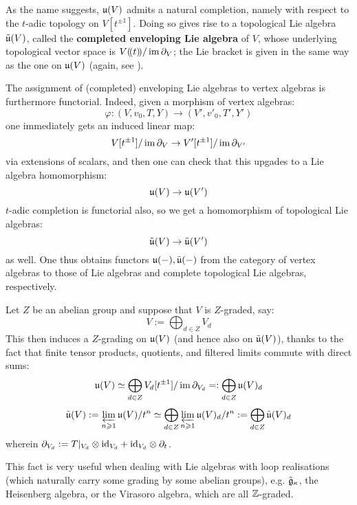         As the name suggests, $\mathfrak{u}(V)$ admits a natural completion, namely with respect to the $t$-adic topology on $V[t^{\pm 1}]$. Doing so gives rise to a topological Lie algebra $\tilde{\mathfrak{u}}(V)$, called the \textbf{completed enveloping Lie algebra} of $V$, whose underlying topological vector space is $V(\!(t)\!)/\operatorname{im} \partial_V$; the Lie bracket is given in the same way as the one on $\mathfrak{u}(V)$ (again, see \cite[Theorem 4.1.2]{frenkel_ben_zvi_vertex_algebras_and_algebraic_curves}).

        \begin{remark}
            The assignment of (completed) enveloping Lie algebras to vertex algebras is furthermore functorial. Indeed, given a morphism of vertex algebras:
                $$\varphi: (V, v_0, T, Y) \to (V', v'_0, T', Y')$$
            one immediately gets an induced linear map:
                $$V[t^{\pm 1}]/\operatorname{im} \partial_V \to V'[t^{\pm 1}]/\operatorname{im} \partial_{V'}$$
            via extensions of scalars, and then one can check that this upgades to a Lie algebra homomorphism:
                $$\mathfrak{u}(V) \to \mathfrak{u}(V')$$
            $t$-adic completion is functorial also, so we get a homomorphism of topological Lie algebras:
                $$\tilde{\mathfrak{u}}(V) \to \tilde{\mathfrak{u}}(V')$$
            as well. One thus obtains functors $\mathfrak{u}(-), \tilde{\mathfrak{u}}(-)$ from the category of vertex algebras to those of Lie algebras and complete topological Lie algebras, respectively. 
        \end{remark}

        \begin{remark}
            Let $Z$ be an abelian group and suppose that $V$ is $Z$-graded, say:
                $$V := \bigoplus_{d \in Z} V_d$$
            This then induces a $Z$-grading on $\mathfrak{u}(V)$ (and hence also on $\tilde{\mathfrak{u}}(V)$), thanks to the fact that finite tensor products, quotients, and filtered limits commute with direct sums:
                $$\mathfrak{u}(V) \simeq \bigoplus_{d \in Z} V_d[t^{\pm 1}]/\operatorname{im} \partial_{V_d} =: \bigoplus_{d \in Z} \mathfrak{u}(V)_d$$
                $$\tilde{\mathfrak{u}}(V) := \varprojlim_{n \geqslant 1} \mathfrak{u}(V)/t^n \simeq \bigoplus_{d \in Z} \varprojlim_{n \geqslant 1} \mathfrak{u}(V)_d/t^n := \bigoplus_{d \in Z} \tilde{\mathfrak{u}}(V)_d$$
            wherein $\del_{V_d} := T|_{V_d} \tensor \id_{V_d} + \id_{V_d} \tensor \del_t$.

            This fact is very useful when dealing with Lie algebras with loop realisations (which naturally carry some grading by some abelian groups), e.g. $\tilde{\mathfrak{g}}_{\kappa}$, the Heisenberg algebra, or the Virasoro algebra, which are all $\mathbb{Z}$-graded.
        \end{remark}

